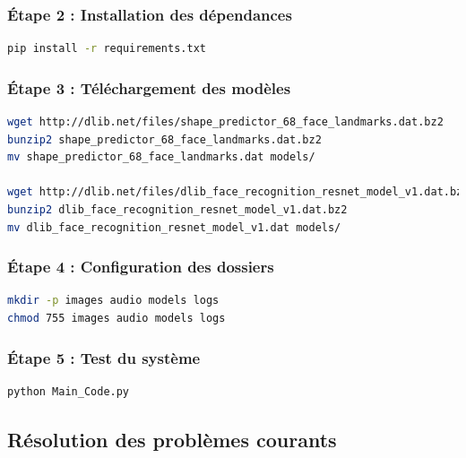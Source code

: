 \documentclass[12pt,a4paper]{article}
\begin{document}
\subsubsection{Étape 2 : Installation des dépendances}

\begin{lstlisting}[language=bash, caption=Installation des packages Python]
pip install -r requirements.txt
\end{lstlisting}

\subsubsection{Étape 3 : Téléchargement des modèles}

\begin{lstlisting}[language=bash, caption=Téléchargement des modèles dlib]
wget http://dlib.net/files/shape_predictor_68_face_landmarks.dat.bz2
bunzip2 shape_predictor_68_face_landmarks.dat.bz2
mv shape_predictor_68_face_landmarks.dat models/

wget http://dlib.net/files/dlib_face_recognition_resnet_model_v1.dat.bz2
bunzip2 dlib_face_recognition_resnet_model_v1.dat.bz2
mv dlib_face_recognition_resnet_model_v1.dat models/
\end{lstlisting}

\subsubsection{Étape 4 : Configuration des dossiers}

\begin{lstlisting}[language=bash, caption=Création de l'arborescence]
mkdir -p images audio models logs
chmod 755 images audio models logs
\end{lstlisting}

\subsubsection{Étape 5 : Test du système}

\begin{lstlisting}[language=bash, caption=Lancement du système]
python Main_Code.py
\end{lstlisting}

\subsection{Résolution des problèmes courants}
\end{document}

